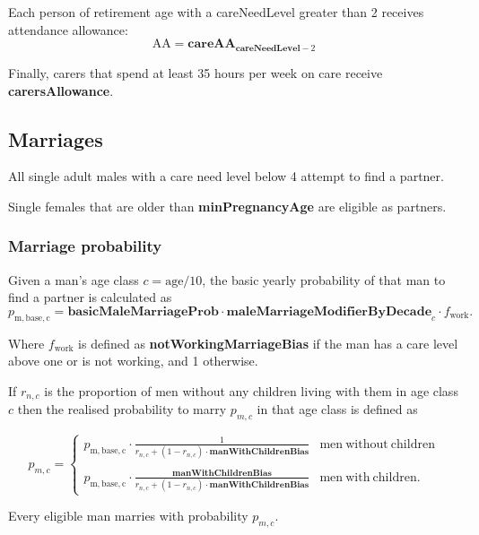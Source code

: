 \documentclass{article}
\begin{document}
Each person of retirement age with a \textsf{careNeedLevel} greater than 2 receives attendance allowance:
\[
\textrm{AA} = \textbf{careAA}_{\textbf{careNeedLevel}-2}
\]

Finally, carers that spend at least 35 hours per week on care receive \textbf{carersAllowance}.



\subsection{Marriages}

All single adult males with a care need level below 4 attempt to find a partner.

Single females that are older than \textbf{minPregnancyAge} are eligible as partners.

\subsubsection*{Marriage probability}

Given a man's age class $c = \mathrm{age}/10$, the basic yearly probability of that man to find a partner is calculated as 
\[
p_\mathrm{m, base, c} = \mathbf{basicMaleMarriageProb} \cdot \mathbf{maleMarriageModifierByDecade}_c \cdot f_\mathrm{work}.
\]

Where $f_\mathrm{work}$ is defined as \textbf{notWorkingMarriageBias} if the man has a care level above one or is not working, and 1 otherwise.

If $r_{n,c}$ is the proportion of men without any children living with them in age class $c$ then the realised probability to marry $p_{m, c}$ in that age class is defined as

\[p_{m,c} = \left\{
    \begin{array}{ll}
        p_\mathrm{m, base, c} \cdot \frac{1}{r_{n,c}+(1-r_{n,c})\cdot\mathbf{manWithChildrenBias}} & \mathrm{men~without~children}\\
        \\
        p_\mathrm{m, base, c} \cdot \frac{\mathbf{manWithChildrenBias}}{r_{n,c}+(1-r_{n,c})\cdot\mathbf{manWithChildrenBias}} & \mathrm{men~with~children}.
    \end{array}\right. \]

Every eligible man marries with probability $p_{m,c}$.
\end{document}
